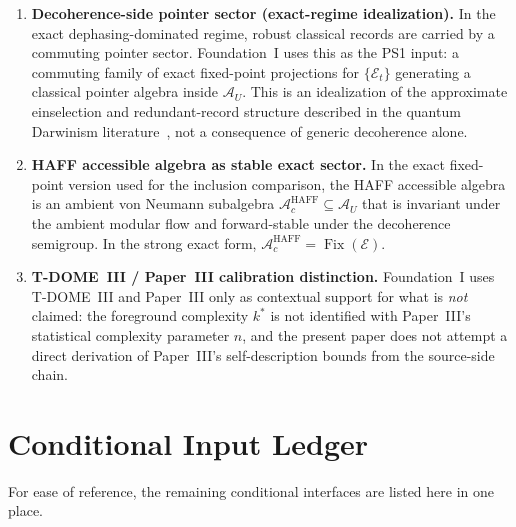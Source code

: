 \documentclass[12pt]{article}
\theoremstyle{definition}
\theoremstyle{remark}
\begin{document}
\begin{enumerate}
\item \textbf{Decoherence-side pointer sector (exact-regime idealization).}
In the exact dephasing-dominated regime, robust classical records are
carried by a commuting pointer sector. Foundation~I uses this as the
PS1 input: a commuting family of exact fixed-point projections for
\(\{\mathcal E_t\}\) generating a classical pointer algebra inside
\(\mathcal A_U\). This is an idealization of the approximate
einselection and redundant-record structure described in the quantum
Darwinism literature~\cite{Zurek2003,Zurek2009}, not a consequence of
generic decoherence alone.

\item \textbf{HAFF accessible algebra as stable exact sector.}
In the exact fixed-point version used for the inclusion comparison, the
HAFF accessible algebra is an ambient von Neumann subalgebra
\(\mathcal A_c^{\mathrm{HAFF}}\subseteq \mathcal A_U\) that is
invariant under the ambient modular flow and forward-stable under the
decoherence semigroup. In the strong exact form,
\(\mathcal A_c^{\mathrm{HAFF}}=\operatorname{Fix}(\mathcal E)\).

\item \textbf{T-DOME~III / Paper~III calibration distinction.}
Foundation~I uses T-DOME~III and Paper~III only as contextual support
for what is \emph{not} claimed: the foreground complexity \(k^*\) is not
identified with Paper~III's statistical complexity parameter \(n\), and
the present paper does not attempt a direct derivation of Paper~III's
self-description bounds from the source-side chain.
\end{enumerate}

\section{Conditional Input Ledger}\label{app:conditional_ledger}

For ease of reference, the remaining conditional interfaces are listed
here in one place.
\end{document}
